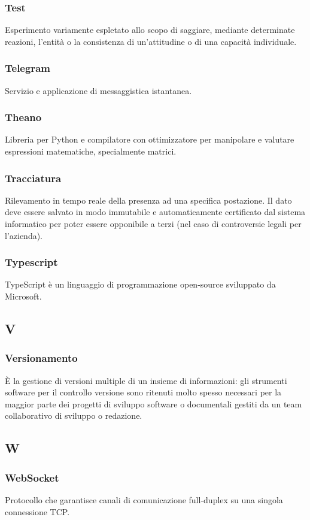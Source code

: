 \subsubsection*{Test} Esperimento variamente espletato allo scopo di saggiare, mediante determinate reazioni, l'entità o la consistenza di un'attitudine o di una capacità individuale.
\subsubsection*{Telegram} Servizio e applicazione di messaggistica istantanea.
\subsubsection*{Theano} Libreria per Python e compilatore con ottimizzatore per manipolare e valutare espressioni matematiche, specialmente matrici.
\subsubsection*{Tracciatura} Rilevamento in tempo reale della presenza ad una specifica
postazione. Il dato deve essere salvato in modo immutabile e automaticamente certificato dal
sistema informatico per poter essere opponibile a terzi (nel caso di controversie legali per l’azienda).
\subsubsection*{Typescript} TypeScript è un linguaggio di programmazione open-source sviluppato da Microsoft.

\subsection*{V}
\subsubsection*{Versionamento} È la gestione di versioni multiple di un insieme di informazioni: gli strumenti software per il controllo versione sono ritenuti molto spesso necessari per la maggior parte dei progetti di sviluppo software o documentali gestiti da un team collaborativo di sviluppo o redazione.
\subsection*{W}
\subsubsection*{WebSocket} Protocollo che garantisce canali di comunicazione full-duplex su una singola connessione TCP.
